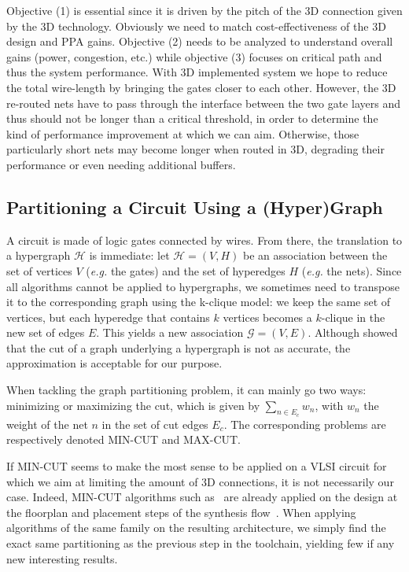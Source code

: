 \documentclass[conference]{IEEEtran}
\begin{document}
Objective (1) is essential since it is driven by the pitch of the 3D connection given by the 3D technology. Obviously we need to match cost-effectiveness of the 3D design and PPA gains. Objective (2) needs to be analyzed to understand overall gains (power, congestion, etc.) while objective (3) focuses on critical path and thus the system performance. With 3D implemented system we hope to reduce the total wire-length by bringing the gates closer to each other. However, the 3D re-routed nets have to pass through the interface between the two gate layers and thus should not be longer than a critical threshold, in order to determine the kind of performance improvement at which we can aim. 
Otherwise, those particularly short nets may become longer when routed in 3D, degrading their performance or even needing additional buffers.

\subsection{Partitioning a Circuit Using a (Hyper)Graph}
A circuit is made of logic gates connected by wires.
From there, the translation to a hypergraph $\mathcal{H}$ is immediate: let $\mathcal{H} = (V, H)$ be an association between the set of vertices $V$ (\textit{e.g.} the gates) and the set of hyperedges $H$ (\textit{e.g.} the nets). %
Since all algorithms cannot be applied to hypergraphs, we sometimes need to transpose it to the corresponding graph using the k-clique model: we keep the same set of vertices, but each hyperedge that contains $k$ vertices becomes a $k$-clique in the new set of edges $E$.
This yields a new association $\mathcal{G} = (V, E)$.
Although \cite{IhlerEdmund;WagnerDorothea;Wagner1993} showed that the cut of a graph underlying a hypergraph is not as accurate, the approximation is acceptable for our purpose.

When tackling the graph partitioning problem, it can mainly go two ways: minimizing or maximizing the cut, which is given by $\sum_{n \in E_c} w_{n}$, with $w_n$ the weight of the net $n$ in the set of cut edges $E_c$.
The corresponding problems are respectively denoted MIN-CUT and MAX-CUT.

If MIN-CUT seems to make the most sense to be applied on a VLSI circuit for which we aim at limiting the amount of 3D connections, it is not necessarily our case.
Indeed, MIN-CUT algorithms such as~\cite{Karypis1999, Aykanat2011, Caldwell2000} are already applied on the design at the floorplan and placement steps of the synthesis flow~\cite{KahngAndrewB.Lienig2011}.
When applying algorithms of the same family on the resulting architecture, we simply find the exact same partitioning as the previous step in the toolchain, yielding few if any new interesting results.
\end{document}
